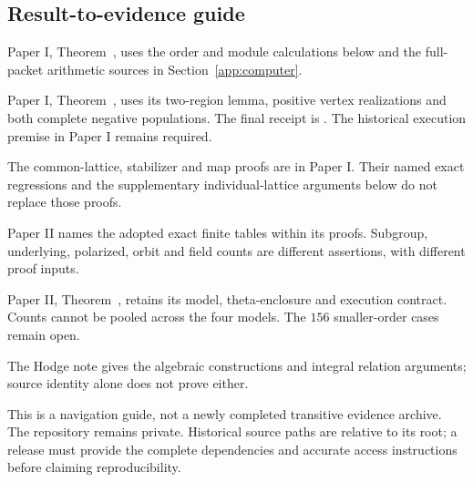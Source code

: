 \subsection{Result-to-evidence guide}
\begin{description}[leftmargin=1em]
\item[Packet domain.] Paper I, Theorem~,
uses the order and module calculations below and the full-packet arithmetic
sources in Section~\ref{app:computer}.
\item[Curve intersection.] Paper I, Theorem~,
uses its two-region lemma, positive vertex realizations and both complete
negative populations. The final receipt is
.
The historical execution premise in Paper I remains required.
\item[Principal geometry.] The common-lattice, stabilizer and map proofs
are in Paper I. Their named exact regressions and the supplementary
individual-lattice arguments below do not replace those proofs.
\item[Finite quotients and descent.] Paper II names the adopted exact
finite tables within its proofs. Subgroup, underlying, polarized, orbit
and field counts are different assertions, with different proof inputs.
\item[Jacobian exclusion.] Paper II, Theorem~,
retains its model, theta-enclosure and execution contract. Counts cannot be
pooled across the four models. The $156$ smaller-order cases remain open.
\item[Hodge tensors.] The Hodge note gives the algebraic constructions and
integral relation arguments; source identity alone does not prove either.
\end{description}
This is a navigation guide, not a newly completed transitive evidence
archive. The repository remains private. Historical source paths are
relative to its root; a release must provide the complete dependencies
and accurate access instructions before claiming reproducibility.
